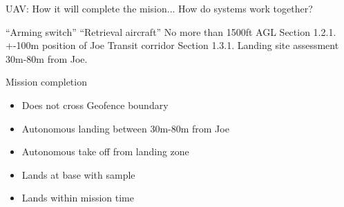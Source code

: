 UAV: How it will complete the mision...
How do systems work together?

``Arming switch''
``Retrieval aircraft''
No more than 1500ft AGL
Section 1.2.1. +-100m position of Joe
Transit corridor
Section 1.3.1. Landing site assessment
30m-80m from Joe.

Mission completion
\begin{itemize}
	\item Does not cross Geofence boundary
	\item Autonomous landing between 30m-80m from Joe
	\item Autonomous take off from landing zone
	\item Lands at base with sample
	\item Lands within mission time
\end{itemize}